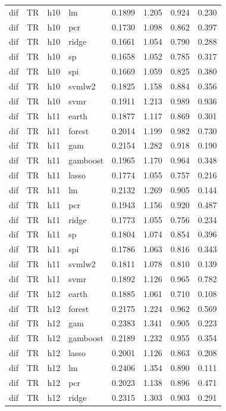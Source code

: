 \begin{ThreePartTable}
\begin{longtable}[t]{llclcccc}
dif & TR & h10 & lm & 0.1899 & 1.205 & 0.924 & 0.230\\
dif & TR & h10 & pcr & 0.1730 & 1.098 & 0.862 & 0.397\\
dif & TR & h10 & ridge & 0.1661 & 1.054 & 0.790 & 0.288\\
dif & TR & h10 & sp & 0.1658 & 1.052 & 0.785 & 0.317\\
dif & TR & h10 & spi & 0.1669 & 1.059 & 0.825 & 0.380\\
dif & TR & h10 & svmlw2 & 0.1825 & 1.158 & 0.884 & 0.356\\
dif & TR & h10 & svmr & 0.1911 & 1.213 & 0.989 & 0.936\\
\addlinespace
dif & TR & h11 & earth & 0.1877 & 1.117 & 0.869 & 0.301\\
dif & TR & h11 & forest & 0.2014 & 1.199 & 0.982 & 0.730\\
dif & TR & h11 & gam & 0.2154 & 1.282 & 0.918 & 0.190\\
dif & TR & h11 & gamboost & 0.1965 & 1.170 & 0.964 & 0.348\\
dif & TR & h11 & lasso & 0.1774 & 1.055 & 0.757 & 0.216\\
dif & TR & h11 & lm & 0.2132 & 1.269 & 0.905 & 0.144\\
dif & TR & h11 & pcr & 0.1943 & 1.156 & 0.920 & 0.487\\
dif & TR & h11 & ridge & 0.1773 & 1.055 & 0.756 & 0.234\\
dif & TR & h11 & sp & 0.1804 & 1.074 & 0.854 & 0.396\\
dif & TR & h11 & spi & 0.1786 & 1.063 & 0.816 & 0.343\\
dif & TR & h11 & svmlw2 & 0.1811 & 1.078 & 0.810 & 0.139\\
dif & TR & h11 & svmr & 0.1892 & 1.126 & 0.965 & 0.782\\
\addlinespace
dif & TR & h12 & earth & 0.1885 & 1.061 & 0.710 & 0.108\\
dif & TR & h12 & forest & 0.2175 & 1.224 & 0.962 & 0.569\\
dif & TR & h12 & gam & 0.2383 & 1.341 & 0.905 & 0.223\\
dif & TR & h12 & gamboost & 0.2189 & 1.232 & 0.955 & 0.354\\
dif & TR & h12 & lasso & 0.2001 & 1.126 & 0.863 & 0.208\\
dif & TR & h12 & lm & 0.2406 & 1.354 & 0.890 & 0.111\\
dif & TR & h12 & pcr & 0.2023 & 1.138 & 0.896 & 0.471\\
dif & TR & h12 & ridge & 0.2315 & 1.303 & 0.903 & 0.291\\

\end{longtable}
\end{ThreePartTable}
